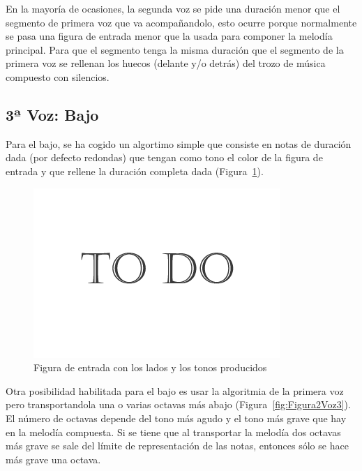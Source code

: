 En la mayoría de ocasiones, la segunda voz se pide una duración menor que el segmento de primera voz que va acompañandolo, esto ocurre porque normalmente se pasa una figura de entrada menor que la usada para componer la melodía principal. Para que el segmento tenga la misma duración que el segmento de la primera voz se rellenan los huecos (delante y/o detrás) del trozo de música compuesto con silencios.


\subsection{3ª Voz: Bajo}

Para el bajo, se ha cogido un algortimo simple que consiste en notas de duración dada (por defecto redondas) que tengan como tono el color de la figura de entrada y que rellene la duración completa dada (Figura~\ref{fig:Figura1Voz3}).

		\begin{figure}[htbp]
		\centering
		\hspace*{0.0in}
		\includegraphics[scale=0.57]{graphics/todo.png}
		\caption{Figura de entrada con los lados y los tonos producidos}
		\label{fig:Figura1Voz3}
		\end{figure}

Otra posibilidad habilitada para el bajo es usar la algoritmia de la primera voz pero transportandola una o varias octavas más abajo (Figura~\ref{fig:Figura2Voz3}). El número de octavas depende del tono más agudo y el tono más grave que hay en la melodía compuesta. Si se tiene que al transportar la melodía dos octavas más grave se sale del límite de representación de las notas, entonces sólo se hace más grave una octava.

